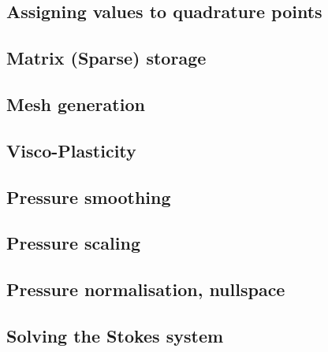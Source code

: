 \documentclass[a4paper]{article}
\numberwithin{equation}{section}
\begin{document}
\subsection{Assigning values to quadrature points}  %
\newpage %
\subsection{Matrix (Sparse) storage}  %
\newpage %
\subsection{Mesh generation} \label{sec:meshes}  %
\newpage %
\subsection{Visco-Plasticity}  %
\newpage %
\subsection{Pressure smoothing \label{psmoothing}}  %
\newpage %
\subsection{Pressure scaling}  %
\newpage %
\subsection{Pressure normalisation, nullspace\label{ss_pnorm}}  %
\newpage %
\subsection{Solving the Stokes system \label{sec:solvers}}  %
\newpage %
\end{document}
